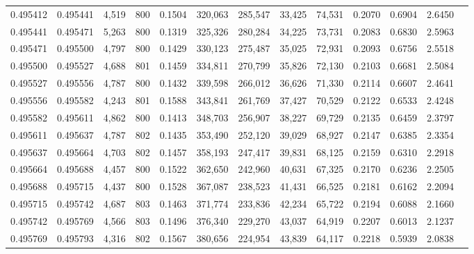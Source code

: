 \begin{tabular}{rrrrrrrrrrrrr}
0.495412 & 0.495441 &  4,519 & 800 &                                     0.1504 & 320,063 & 285,547 &  33,425 &  74,531 & 0.2070 & 0.6904 & 2.6450 \\
0.495441 & 0.495471 &  5,263 & 800 &                                     0.1319 & 325,326 & 280,284 &  34,225 &  73,731 & 0.2083 & 0.6830 & 2.5963 \\
0.495471 & 0.495500 &  4,797 & 800 &                                     0.1429 & 330,123 & 275,487 &  35,025 &  72,931 & 0.2093 & 0.6756 & 2.5518 \\
0.495500 & 0.495527 &  4,688 & 801 &                                     0.1459 & 334,811 & 270,799 &  35,826 &  72,130 & 0.2103 & 0.6681 & 2.5084 \\
0.495527 & 0.495556 &  4,787 & 800 &                                     0.1432 & 339,598 & 266,012 &  36,626 &  71,330 & 0.2114 & 0.6607 & 2.4641 \\
0.495556 & 0.495582 &  4,243 & 801 &                                     0.1588 & 343,841 & 261,769 &  37,427 &  70,529 & 0.2122 & 0.6533 & 2.4248 \\
0.495582 & 0.495611 &  4,862 & 800 &                                     0.1413 & 348,703 & 256,907 &  38,227 &  69,729 & 0.2135 & 0.6459 & 2.3797 \\
0.495611 & 0.495637 &  4,787 & 802 &                                     0.1435 & 353,490 & 252,120 &  39,029 &  68,927 & 0.2147 & 0.6385 & 2.3354 \\
0.495637 & 0.495664 &  4,703 & 802 &                                     0.1457 & 358,193 & 247,417 &  39,831 &  68,125 & 0.2159 & 0.6310 & 2.2918 \\
0.495664 & 0.495688 &  4,457 & 800 &                                     0.1522 & 362,650 & 242,960 &  40,631 &  67,325 & 0.2170 & 0.6236 & 2.2505 \\
0.495688 & 0.495715 &  4,437 & 800 &                                     0.1528 & 367,087 & 238,523 &  41,431 &  66,525 & 0.2181 & 0.6162 & 2.2094 \\
0.495715 & 0.495742 &  4,687 & 803 &                                     0.1463 & 371,774 & 233,836 &  42,234 &  65,722 & 0.2194 & 0.6088 & 2.1660 \\
0.495742 & 0.495769 &  4,566 & 803 &                                     0.1496 & 376,340 & 229,270 &  43,037 &  64,919 & 0.2207 & 0.6013 & 2.1237 \\
0.495769 & 0.495793 &  4,316 & 802 &                                     0.1567 & 380,656 & 224,954 &  43,839 &  64,117 & 0.2218 & 0.5939 & 2.0838 \\

\end{tabular}
